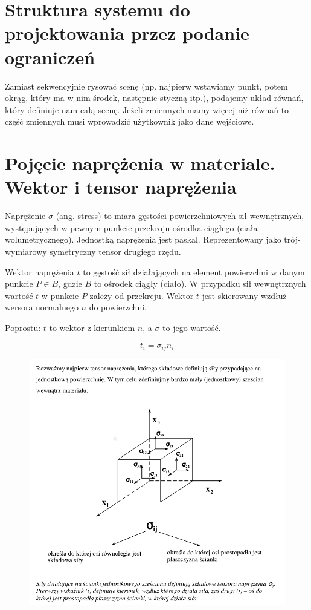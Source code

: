 \documentclass[12pt]{article}
\begin{document}
\section{Struktura systemu do projektowania przez podanie ograniczeń}
Zamiast sekwencyjnie rysować scenę (np. najpierw wstawiamy punkt, potem okrąg, który ma w nim środek, następnie styczną itp.), podajemy układ równań, który definiuje nam całą scenę. Jeżeli zmiennych mamy więcej niż równań to część zmiennych musi wprowadzić użytkownik jako dane wejściowe.


\section{Pojęcie naprężenia w materiale. Wektor i tensor naprężenia}
Naprężenie $\sigma$ (ang. stress) to miara gęstości powierzchniowych sił wewnętrznych, występujących w pewnym punkcie przekroju ośrodka ciągłego (ciała wolumetrycznego). Jednostką naprężenia jest paskal. Reprezentowany jako trój-wymiarowy symetryczny tensor drugiego rzędu.

Wektor naprężenia $t$ to gęstość sił działających na element powierzchni w danym punkcie $P \in B$, gdzie $B$ to ośrodek ciągły (ciało). W przypadku sił wewnętrznych wartość $t$ w punkcie $P$ zależy od przekreju. Wektor $t$ jest skierowany wzdłuż wersora normalnego $n$ do powierzchni.

Poprostu: $t$ to wektor z kierunkiem $n$, a $\sigma$ to jego wartość.

\begin{equation}
t_{i} = \sigma_{ij}n_{i}
\end{equation}



\begin{figure}[H]
	\centering
	\includegraphics[scale=0.5]{Pictures/stress.png}
	\caption{}
\end{figure}
\end{document}
